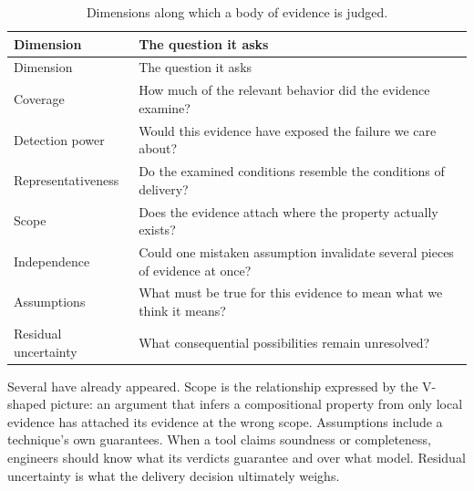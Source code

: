 \begin{longtable}[]{@{}
  >{\raggedright\arraybackslash}p{}
  >{\raggedright\arraybackslash}p{}@{}}
\caption{Dimensions along which a body of evidence is judged.}\label{tbl-evidence-strength}\tabularnewline
\toprule\noalign{}
\begin{minipage}[b]{\linewidth}\raggedright
Dimension
\end{minipage} & \begin{minipage}[b]{\linewidth}\raggedright
The question it asks
\end{minipage} \\
\midrule\noalign{}
\endfirsthead
\toprule\noalign{}
\begin{minipage}[b]{\linewidth}\raggedright
Dimension
\end{minipage} & \begin{minipage}[b]{\linewidth}\raggedright
The question it asks
\end{minipage} \\
\midrule\noalign{}
\endhead
\bottomrule\noalign{}
\endlastfoot
Coverage & How much of the relevant behavior did the evidence examine? \\
Detection power & Would this evidence have exposed the failure we care about? \\
Representativeness & Do the examined conditions resemble the conditions of delivery? \\
Scope & Does the evidence attach where the property actually exists? \\
Independence & Could one mistaken assumption invalidate several pieces of evidence at once? \\
Assumptions & What must be true for this evidence to mean what we think it means? \\
Residual uncertainty & What consequential possibilities remain unresolved? \\
\end{longtable}

Several have already appeared. Scope is the relationship expressed by the V-shaped picture: an
argument that infers a compositional property from only local evidence has attached its evidence at
the wrong scope. Assumptions include a technique's own guarantees. When a tool claims soundness or
completeness, engineers should know what its verdicts guarantee and over what model. Residual
uncertainty is what the delivery decision ultimately weighs.

